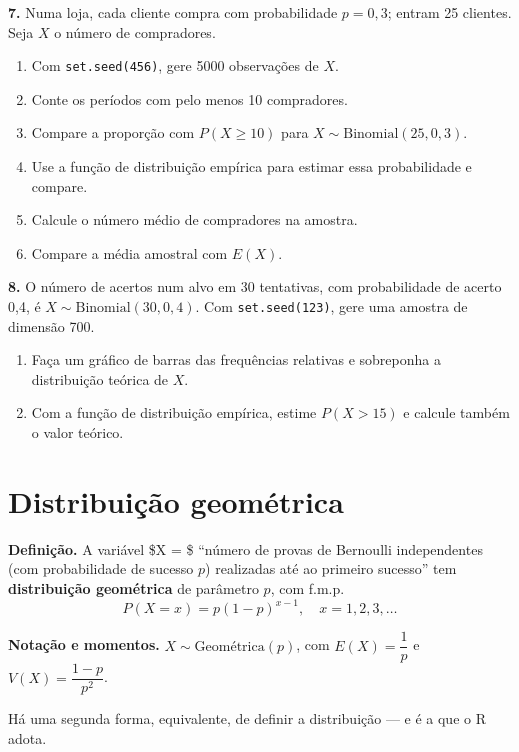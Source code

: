 \documentclass[
  portuguese,
  11pt,
  openany]{book}
\providecommand{\tightlist}{%
  \setlength{\itemsep}{0pt}\setlength{\parskip}{0pt}}
\begin{document}
\textbf{7.} Numa loja, cada cliente compra com probabilidade \(p = 0{,}3\); entram 25 clientes.
Seja \(X\) o número de compradores.

\begin{enumerate}
\def\labelenumi{(\alph{enumi})}
\tightlist
\item
  Com \texttt{set.seed(456)}, gere 5000 observações de \(X\).
\item
  Conte os períodos com pelo menos 10 compradores.
\item
  Compare a proporção com \(P(X \geq 10)\) para \(X \sim \text{Binomial}(25, 0{,}3)\).
\item
  Use a função de distribuição empírica para estimar essa probabilidade e compare.
\item
  Calcule o número médio de compradores na amostra.
\item
  Compare a média amostral com \(E(X)\).
\end{enumerate}

\textbf{8.} O número de acertos num alvo em 30 tentativas, com probabilidade de acerto 0,4, é
\(X \sim \text{Binomial}(30, 0{,}4)\). Com \texttt{set.seed(123)}, gere uma amostra de dimensão
700.

\begin{enumerate}
\def\labelenumi{(\alph{enumi})}
\tightlist
\item
  Faça um gráfico de barras das frequências relativas e sobreponha a distribuição
  teórica de \(X\).
\item
  Com a função de distribuição empírica, estime \(P(X > 15)\) e calcule também o valor
  teórico.
\end{enumerate}

\section{Distribuição geométrica}\label{distribuiuxe7uxe3o-geomuxe9trica}

\textbf{Definição.} A variável \$X = \$ ``número de provas de Bernoulli independentes (com
probabilidade de sucesso \(p\)) realizadas até ao primeiro sucesso'' tem \textbf{distribuição
geométrica} de parâmetro \(p\), com f.m.p.
\[P(X = x) = p(1-p)^{x-1}, \quad x = 1, 2, 3, \ldots\]

\textbf{Notação e momentos.} \(X \sim \text{Geométrica}(p)\), com \(E(X) = \dfrac{1}{p}\) e
\(V(X) = \dfrac{1-p}{p^2}\).

Há uma segunda forma, equivalente, de definir a distribuição --- e é a que o R adota.
\end{document}
